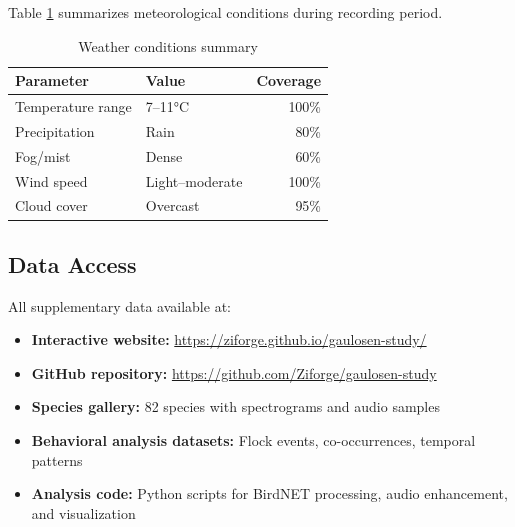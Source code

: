 \documentclass[twocolumn]{article}
\begin{document}
Table \ref{tab:weather} summarizes meteorological conditions during recording period.

\begin{table}[H]
\centering
\caption{Weather conditions summary}
\label{tab:weather}
\begin{tabular}{llr}
\toprule
\textbf{Parameter} & \textbf{Value} & \textbf{Coverage} \\
\midrule
Temperature range & 7--11°C & 100\% \\
Precipitation & Rain & 80\% \\
Fog/mist & Dense & 60\% \\
Wind speed & Light--moderate & 100\% \\
Cloud cover & Overcast & 95\% \\
\bottomrule
\end{tabular}
\end{table}

\subsection{Data Access}

All supplementary data available at:

\begin{itemize}
\item \textbf{Interactive website:} \url{https://ziforge.github.io/gaulosen-study/}
\item \textbf{GitHub repository:} \url{https://github.com/Ziforge/gaulosen-study}
\item \textbf{Species gallery:} 82 species with spectrograms and audio samples
\item \textbf{Behavioral analysis datasets:} Flock events, co-occurrences, temporal patterns
\item \textbf{Analysis code:} Python scripts for BirdNET processing, audio enhancement, and visualization
\end{itemize}
\end{document}
